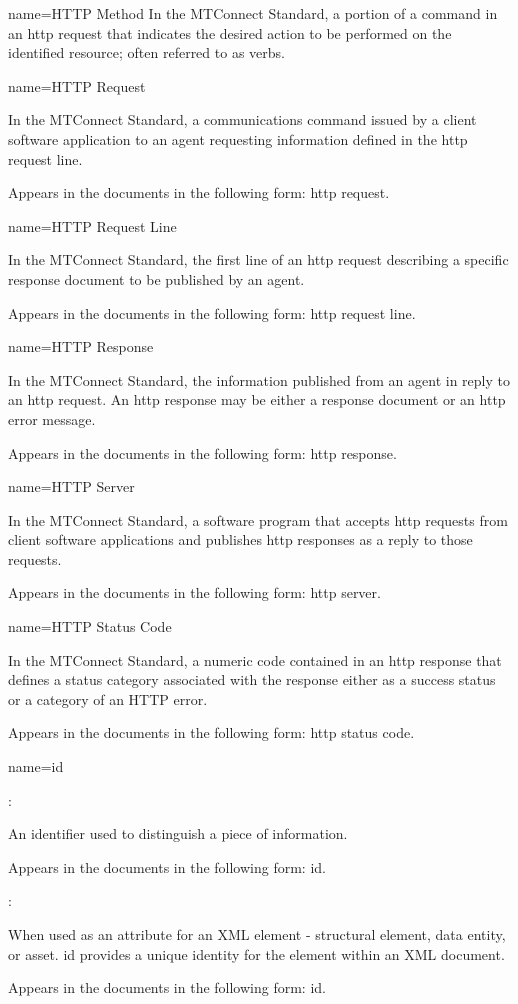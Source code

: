 {
  name={HTTP Method}
}
{
	In the MTConnect Standard, a portion of a command in an \gls{http request} that indicates the desired action to be performed on the identified resource; often referred to as verbs.
}


{
  name={HTTP Request}
}
{
	In the MTConnect Standard, a communications command issued by a client software application to an \gls{agent} requesting information defined in the \gls{http request line}.

	Appears in the documents in the following form: \gls{http request}.
}


{
  name={HTTP Request Line}
}
{
	In the MTConnect Standard, the first line of an \gls{http request} describing a specific \gls{response document} to be published by an \gls{agent}.

	Appears in the documents in the following form: \gls{http request line}.
}


{
  name={HTTP Response}
}
{
	In the MTConnect Standard, the information published from an \gls{agent} in reply to an \gls{http request}.  An \gls{http response} may be either a \gls{response document} or an \gls{http error message}.

	Appears in the documents in the following form: \gls{http response}.
}


{
  name={HTTP Server}
}
{
	In the MTConnect Standard, a software program that accepts \glspl{http request} from client software applications and publishes \glspl{http response} as a reply to those \glspl{request}.

	Appears in the documents in the following form: \gls{http server}.
}


{
  name={HTTP Status Code}
}
{
	In the MTConnect Standard, a numeric code contained in an \gls{http response} that defines a status category associated with the \gls{response} either as a success status or a category of an HTTP error.  

	Appears in the documents in the following form: \gls{http status code}.
}


{
  name={id}
}
{
	:

	An identifier used to distinguish a piece of information.

	Appears in the documents in the following form: id.

	:

	When used as an attribute for an XML element - \gls{structural element}, \gls{data entity}, or \gls{asset}.  \gls{id} provides a unique identity for the element within an XML document.

	Appears in the documents in the following form: \gls{id}.
}



